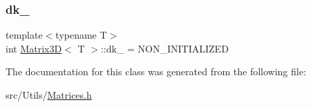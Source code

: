 \mbox{\label{classMatrix3D_a9c5ce04b3a1cb28c7b19cd3b9b3646c6_a9c5ce04b3a1cb28c7b19cd3b9b3646c6}} 
\subsubsection{\texorpdfstring{dk\+\_\+}{dk\_}}
{\footnotesize\ttfamily template$<$typename T$>$ \\
int \mbox{\hyperlink{classMatrix3D}{Matrix3D}}$<$ T $>$\+::dk\+\_\+ = N\+O\+N\+\_\+\+I\+N\+I\+T\+I\+A\+L\+I\+Z\+ED\hspace{0.3cm}{\ttfamily [private]}}



The documentation for this class was generated from the following file\+:\begin{DoxyCompactItemize}
\item 
src/\+Utils/\mbox{\hyperlink{Matrices_8h}{Matrices.\+h}}\end{DoxyCompactItemize}
